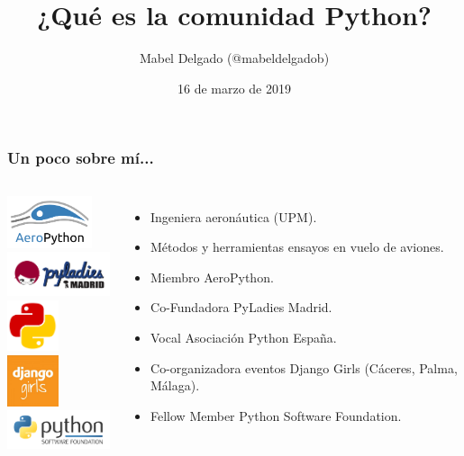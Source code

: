 \documentclass[18pt]{beamer}
\title{¿Qué es la comunidad Python?}
\author{Mabel Delgado (@mabeldelgadob)}
\institute{AI Saturdays (Almería)}
\date{16 de marzo de 2019}
\begin{document}
\begin{frame}
	\titlepage
\end{frame}

\begin{frame}
	\frametitle{Un poco sobre mí...}
	\begin{columns}
		\centering
			\includegraphics[width=2.5cm]{images/aeropython.png}\\
			\includegraphics[width=3.5cm]{images/pyladiesmadrid_alargado.png}\\
			\includegraphics[width=1.5cm]{images/python_spain.png}
			\includegraphics[width=1.5cm]{images/django_girls.jpg}\\
			\includegraphics[width=3.5cm]{images/psf.png}
				
		\begin{itemize}
			\setlength\itemsep{0.6em}		
			\item Ingeniera aeronáutica (UPM).
			\item Métodos y herramientas  ensayos en vuelo de aviones.
			\item Miembro AeroPython.
			\item Co-Fundadora PyLadies Madrid.
			\item Vocal Asociación Python España.
			\item Co-organizadora eventos Django Girls (Cáceres, Palma, Málaga).
			\item Fellow Member Python Software Foundation.
		\end{itemize}		
	\end{columns}
\end{frame}
\end{document}

